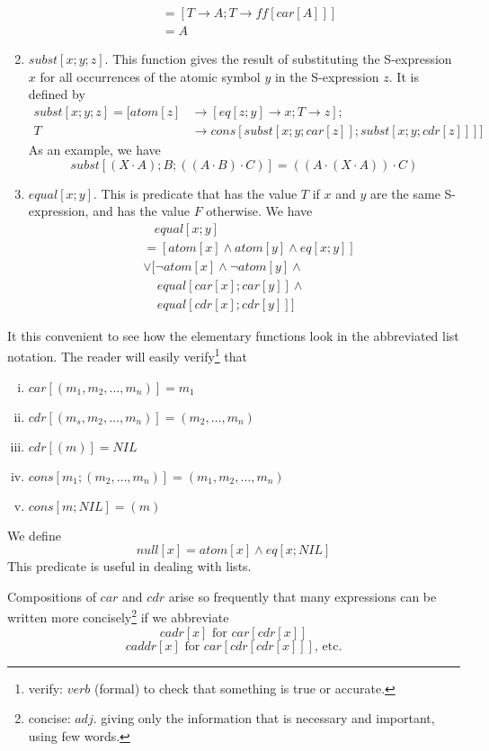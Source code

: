 \documentclass[11pt, a4paper]{article}
\begin{document}
\begin{enumerate}
\begin{align*}
    &= [T \to A; T \to ff[car[A]]]                                         \\
    &= A
  \end{align*}
\item $subst[x; y; z]$. This function gives the result of substituting the
  S-expression $x$ for all occurrences of the atomic symbol $y$ in the
  S-expression $z$. It is defined by
  \begin{align*}
    subst[x; y; z] = [atom[z] &\to [eq [z; y] \to x; T \to z];\\
                          T &\to cons[subst[x; y; car[z]]; subst[x; y; cdr[z]]]]
  \end{align*}
  As an example, we have
  $$ subst[(X \cdot A); B; ((A \cdot B) \cdot C)] = ((A \cdot (X \cdot A)) \cdot
  C) $$
\item $equal[x; y]$. This is predicate that has the value $T$ if $x$ and $y$ are
  the same S-expression, and has the value $F$ otherwise. We have
  \begin{align*}
    &\ \ \ \ equal[x; y]                           \\
    &= [atom[x] \land atom[y] \land eq[x; y]]      \\
    &\lor [\lnot atom[x] \land \lnot atom[y] \land \\
    &\ \ \ \ \ equal[car[x]; car[y]] \land         \\
    &\ \ \ \ \ equal[cdr[x]; cdr[y]]]
  \end{align*}
\end{enumerate}

It this convenient to see how the elementary functions look in the abbreviated
list notation. The reader will easily
verify\footnote{verify: $verb$ (formal) to check that something is true or accurate.}
that
\begin{enumerate}[(i)]
\item $car[(m_1, m_2, \ldots, m_n)] = m_1$
\item $cdr[(m_s, m_2, \ldots, m_n)] = (m_2, \ldots, m_n)$
\item $cdr[(m)] = NIL$
\item $cons[m_1; (m_2, \ldots, m_n)] = (m_1, m_2, \ldots, m_n)$
\item $cons[m; NIL] = (m)$
\end{enumerate}

We define
$$ null[x] = atom[x] \land eq[x; NIL] $$
This predicate is useful in dealing with lists.

Compositions of $car$ and $cdr$ arise so frequently that many expressions can be
written more
concisely\footnote{concise: $adj.$ giving only the information that is necessary
  and important, using few words.}
if we abbreviate
$$ cadr[x] \text{ for } car[cdr[x]] $$
$$ caddr[x] \text{ for } car[cdr[cdr[x]]] \text{, etc.} $$
\end{document}
